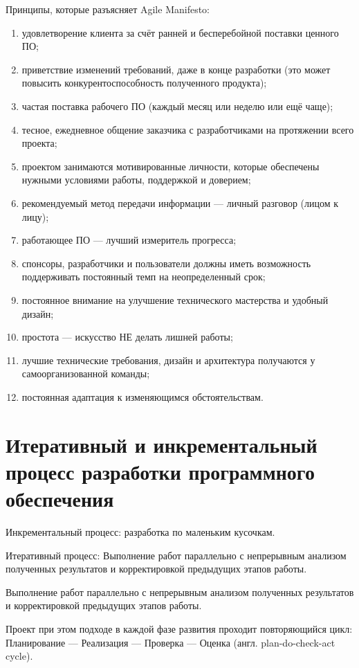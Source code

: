 \documentclass{article}
\let\stdsection\section
\renewcommand\section{\newpage\stdsection}
\begin{document}
    Принципы, которые разъясняет Agile Manifesto:
    \begin{enumerate}
        \item удовлетворение клиента за счёт ранней и бесперебойной поставки ценного ПО;
        \item приветствие изменений требований, даже в конце разработки (это может повысить конкурентоспособность полученного продукта);
        \item частая поставка рабочего ПО (каждый месяц или неделю или ещё чаще);
        \item тесное, ежедневное общение заказчика с разработчиками на протяжении всего проекта;
        \item проектом занимаются мотивированные личности, которые обеспечены нужными условиями работы, поддержкой и доверием;
        \item рекомендуемый метод передачи информации — личный разговор (лицом к лицу);
        \item работающее ПО — лучший измеритель прогресса;
        \item спонсоры, разработчики и пользователи должны иметь возможность поддерживать постоянный темп на неопределенный срок;
        \item постоянное внимание на улучшение технического мастерства и удобный дизайн;
        \item простота — искусство НЕ делать лишней работы;
        \item лучшие технические требования, дизайн и архитектура получаются у самоорганизованной команды;
        \item постоянная адаптация к изменяющимся обстоятельствам.
    \end{enumerate}

\section{Итеративный и инкрементальный процесс разработки программного обеспечения}
    Инкрементальный процесс: разработка по маленьким кусочкам.

    Итеративный процесс: Выполнение работ параллельно с непрерывным анализом полученных результатов и корректировкой предыдущих этапов работы.

    Выполнение работ параллельно с непрерывным анализом полученных результатов и корректировкой предыдущих этапов работы.

    Проект при этом подходе в каждой фазе развития проходит повторяющийся цикл: Планирование — Реализация — Проверка — Оценка (англ. plan-do-check-act cycle).
\end{document}
